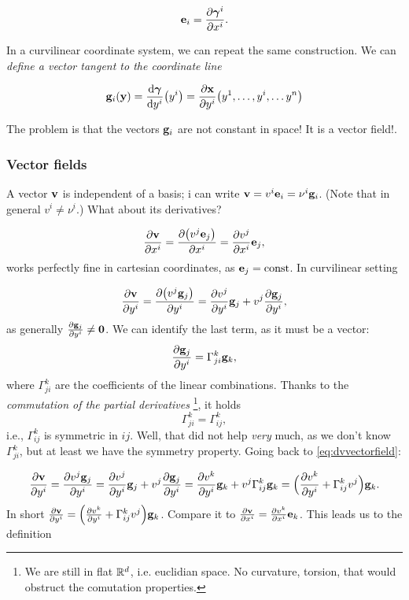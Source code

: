\documentclass[reqno, a4paper]{article}
\begin{document}
\begin{equation}
	\vb{e}_i = \pdv{\vb*{\gamma}^i}{x^i}.
\end{equation}

In a curvilinear coordinate system, we can repeat the same construction. We can \textit{define a vector tangent to the coordinate line}

\begin{equation}
	\vb{g}_i \qty(\vb{y})=\dv{\vb*{\gamma}}{y^i}\qty(y^i) = \pdv{\vb{x}}{y^i}\qty(y^1, \dots, y^i, \dots y^n)
\end{equation}

The problem is that the vectors $\vb{g}_i$ are not constant in space! It is a vector field!.

\subsubsection{Vector fields}
\label{sec:vector_fields}

A vector $\vb{v}$ is independent of a basis; i can write $\vb{v}=v^i \vb{e}_i = \nu^i \vb{g}_i$. (Note that in general $v^i \neq \nu^i$.) What about its derivatives?

\[
	\pdv{\vb{v}}{x^i}=\pdv{\qty(v^j \vb{e}_j)}{x^i} = \pdv{v^j}{x^i}\vb{e}_j,
\]
works perfectly fine in cartesian coordinates, as $\vb{e}_j = \text{const}$. In curvilinear setting

\begin{equation}
	\label{eq:dvvectorfield}
	\pdv{\vb{v}}{y^i}=\pdv{\qty(v^j \vb{g}_j)}{y^i}= \pdv{v^j}{y^i}\vb{g}_j + v^j \pdv{\vb{g}_j}{y^i},
\end{equation}
as generally $\pdv{\vb{g}_j}{y^i} \neq \vb{0}$. We can identify the last term, as it must be a vector:
\[
	\pdv{\vb{g}_j}{y^i} = \Gamma^k_{j i}\vb{g}_k,
\]
where $\Gamma^k_{ji}$ are the coefficients of the linear combinations. Thanks to the \textit{commutation of the partial derivatives} \footnote{We are still in flat ${\mathbb R}^d$, i.e. euclidian space. No curvature, torsion, that would obstruct the comutation properties.}, it holds
\begin{equation}
	\label{eq:symmetry_christoffel}
	\Gamma^k_{ji} = \Gamma^k_{ij},
\end{equation}
i.e., $\Gamma^k_{ij}$ is symmetric in $ij$. Well, that did not help \textit{very} much, as we don't know $\Gamma^k_{ji}$, but at least we have the symmetry property. Going back to \ref{eq:dvvectorfield}:

\begin{equation}
	\pdv{\vb{v}}{y^i}=\pdv{v^j \vb{g}_j}{y^i}= \pdv{v^j}{y^i}\vb{g}_j + v^j \pdv{\vb{g}_j}{y^i} = \pdv{v^k}{y^i}\vb{g}_k + v^j \Gamma^k_{ij}\vb{g}_k = \Big( \pdv{v^k}{y^i}+\Gamma^k_{ij}v^j \Big) \vb{g}_k.
\end{equation}
In short $\pdv{\vb{v}}{y^i} = \Big(\pdv{v^k}{y^i}+\Gamma^k_{ij}v^j\Big) \vb{g}_k$. Compare it to $\pdv{\vb{v}}{x^i}=\pdv{v^k}{x^i}\vb{e}_k$. This leads us to the definition
\end{document}
